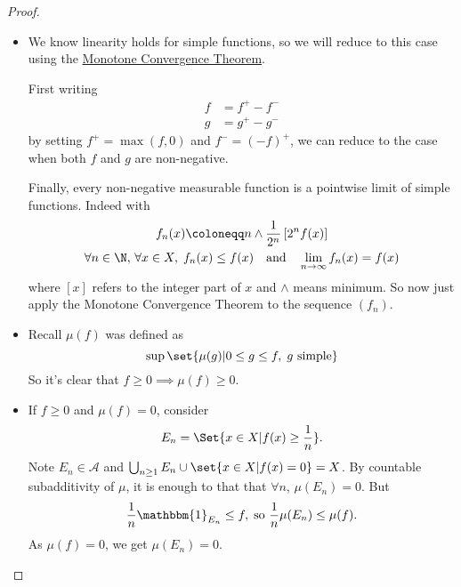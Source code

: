 \documentclass{article}
\newcommand{\1}[1]{\mathbbm{1}_{#1}}
\begin{document}
\begin{proof}
    \leavevmode
    \begin{itemize}
        \item We know linearity holds for simple functions, so we will reduce to this case using the \hyperlink{def:monConv}{Monotone Convergence Theorem}.

            First writing
            \begin{align*}
                f &= f^+ - f^- \\
                g &= g^+ - g^-
            \end{align*}
            by setting $f^+ = \max(f, 0)$ and $f^- = (-f)^+$, we can reduce to the case when both $f$ and $g$ are non-negative.

            Finally, every non-negative measurable function is a pointwise limit of simple functions. Indeed with
            \begin{gather*}
                f_n(x) \coloneqq n \wedge \frac{1}{2^n} \left[2^n f(x)\right] \\
                \forall n \in \N, \, \forall x \in X, \; f_n(x) \leq f(x) \quad \text{and} \quad \lim_{n \to \infty} f_n(x) = f(x)
            \end{gather*}
            where $[x]$ refers to the integer part of $x$ and $\wedge$ means minimum.
            So now just apply the Monotone Convergence Theorem to the sequence $(f_n)$.

        \item Recall $\mu(f)$ was defined as
            \begin{equation*}
                \sup\set{\mu(g) | 0 \leq g \leq f, \; g \ \text{simple}}
            \end{equation*}
            So it's clear that $f \geq 0 \implies \mu(f) \geq 0$.
        \item If $f \geq 0$ and $\mu(f) = 0$, consider
            \begin{equation*}
                E_n = \Set{x \in X| f(x) \geq \frac{1}{n}}.
            \end{equation*}
            Note $E_n \in \mathcal{A}$ and $\bigcup_{n \geq 1} E_n \cup \set{x \in X | f(x) = 0} = X$.
            By countable subadditivity of $\mu$, it is enough to that that $\forall n$, $\mu(E_n) = 0$. But
            \begin{equation*}
                \frac{1}{n} \1{{E_n}} \leq f, \; \text{so} \ \frac{1}{n} \mu(E_n) \leq \mu(f).
            \end{equation*}
            As $\mu(f) = 0$, we get $\mu(E_n) = 0$. \qedhere
    \end{itemize}
\end{proof}
\end{document}
